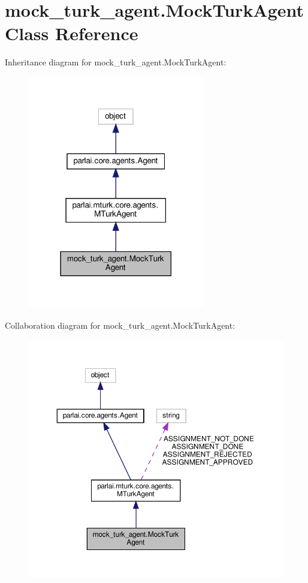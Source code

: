 \hypertarget{classmock__turk__agent_1_1MockTurkAgent}{}\section{mock\+\_\+turk\+\_\+agent.\+Mock\+Turk\+Agent Class Reference}
\label{classmock__turk__agent_1_1MockTurkAgent}


Inheritance diagram for mock\+\_\+turk\+\_\+agent.\+Mock\+Turk\+Agent\+:
\nopagebreak
\begin{figure}[H]
\begin{center}
\leavevmode
\includegraphics[width=218pt]{classmock__turk__agent_1_1MockTurkAgent__inherit__graph}
\end{center}
\end{figure}


Collaboration diagram for mock\+\_\+turk\+\_\+agent.\+Mock\+Turk\+Agent\+:
\nopagebreak
\begin{figure}[H]
\begin{center}
\leavevmode
\includegraphics[width=350pt]{classmock__turk__agent_1_1MockTurkAgent__coll__graph}
\end{center}
\end{figure}
